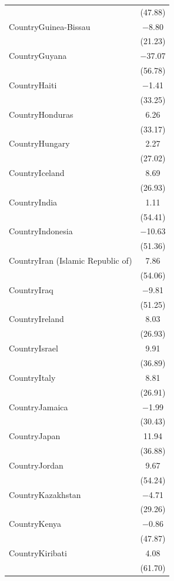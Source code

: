 \documentclass[
  letterpaper,
  DIV=11,
  numbers=noendperiod]{scrartcl}
\begin{document}
\begin{table}
{\begin{tabular}[t]{lc}
 & \vphantom{1} (\num{47.88})\\
CountryGuinea-Bissau & \num{-8.80}\\
 & \vphantom{1} (\num{21.23})\\
CountryGuyana & \num{-37.07}\\
 & (\num{56.78})\\
CountryHaiti & \num{-1.41}\\
 & (\num{33.25})\\
CountryHonduras & \num{6.26}\\
 & (\num{33.17})\\
CountryHungary & \num{2.27}\\
 & \vphantom{1} (\num{27.02})\\
CountryIceland & \num{8.69}\\
 & \vphantom{2} (\num{26.93})\\
CountryIndia & \num{1.11}\\
 & \vphantom{1} (\num{54.41})\\
CountryIndonesia & \num{-10.63}\\
 & \vphantom{1} (\num{51.36})\\
CountryIran (Islamic Republic of) & \num{7.86}\\
 & (\num{54.06})\\
CountryIraq & \num{-9.81}\\
 & (\num{51.25})\\
CountryIreland & \num{8.03}\\
 & \vphantom{1} (\num{26.93})\\
CountryIsrael & \num{9.91}\\
 & \vphantom{1} (\num{36.89})\\
CountryItaly & \num{8.81}\\
 & (\num{26.91})\\
CountryJamaica & \num{-1.99}\\
 & (\num{30.43})\\
CountryJapan & \num{11.94}\\
 & (\num{36.88})\\
CountryJordan & \num{9.67}\\
 & (\num{54.24})\\
CountryKazakhstan & \num{-4.71}\\
 & (\num{29.26})\\
CountryKenya & \num{-0.86}\\
 & (\num{47.87})\\
CountryKiribati & \num{4.08}\\
 & (\num{61.70})\\

\end{tabular}}
\end{table}
\end{document}
